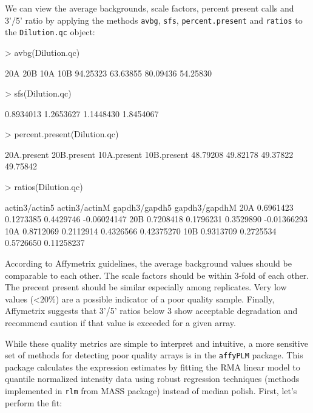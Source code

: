 \documentclass[12pt]{article}
\newcommand{\code}[1]{{\texttt{#1}}}
\begin{document}
We can view the average backgrounds, scale factors, percent present calls and 3'/5' ratio by applying the methods \code{avbg}, \code{sfs}, \code{percent.present} and \code{ratios} to the \code{Dilution.qc} object: 

\begin{Schunk}
\begin{Sinput}
> avbg(Dilution.qc)
\end{Sinput}
\begin{Soutput}
     20A      20B      10A      10B 
94.25323 63.63855 80.09436 54.25830 
\end{Soutput}
\begin{Sinput}
> sfs(Dilution.qc)
\end{Sinput}
\begin{Soutput}
[1] 0.8934013 1.2653627 1.1448430 1.8454067
\end{Soutput}
\begin{Sinput}
> percent.present(Dilution.qc)
\end{Sinput}
\begin{Soutput}
20A.present 20B.present 10A.present 10B.present 
   48.79208    49.82178    49.37822    49.75842 
\end{Soutput}
\begin{Sinput}
> ratios(Dilution.qc)
\end{Sinput}
\begin{Soutput}
    actin3/actin5 actin3/actinM gapdh3/gapdh5 gapdh3/gapdhM
20A     0.6961423     0.1273385     0.4429746   -0.06024147
20B     0.7208418     0.1796231     0.3529890   -0.01366293
10A     0.8712069     0.2112914     0.4326566    0.42375270
10B     0.9313709     0.2725534     0.5726650    0.11258237
\end{Soutput}
\end{Schunk}

According to Affymetrix guidelines, the average background values should be comparable to each other.  The scale factors should be within 3-fold of each other.  The precent present should be similar especially among replicates.  Very low values (<20\%) are a possible indicator of a poor quality sample.  Finally, Affymetrix suggests that 3'/5' ratios below 3 show acceptable degradation and recommend caution if that value is exceeded for a given array.

While these quality metrics are simple to interpret and intuitive, a more sensitive set of methods for detecting poor quality arrays is in the \code{affyPLM} package.  This package calculates the expression estimates by fitting the RMA linear model to quantile normalized intensity data using robust regression techniques (methods implemented in \code{rlm} from MASS package) instead of median polish.  First, let's perform the fit: 
\end{document}
